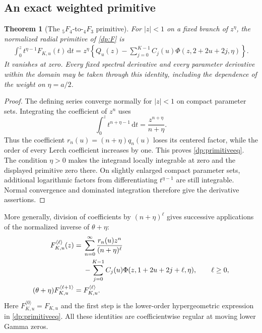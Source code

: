 \documentclass[11pt,a4paper]{article}
\numberwithin{equation}{section}
\newtheorem{theorem}{Theorem}[section]
\theoremstyle{definition}
\theoremstyle{remark}
\newcommand{\dd}{\,\mathrm d}
\begin{document}
\subsection{An exact weighted primitive}
\begin{theorem}[The ${}_5F_4$-to-${}_4F_3$ primitive]\label{dp:primitive}
For $|z|<1$ on a fixed branch of $z^\eta$, the normalized radial
primitive of \eqref{dp:F} is
\begin{align}
 \int_0^z t^{\eta-1}F_{K,u}(t)\dd t
  =z^\eta\left\{Q_u(z)-\sum_{j=0}^{K-1}
            C_j(u)\Phi(z,2+2u+2j,\eta)\right\}.
 \label{dp:primitiveeq}
\end{align}
It vanishes at zero. Every fixed spectral derivative and every
parameter derivative within the domain may be taken through this
identity, including the dependence of the weight on $\eta=a/2$.
\end{theorem}
\begin{proof}
The defining series converge normally for $|z|<1$ on compact parameter
sets. Integrating the coefficient of $z^n$ uses
\[
 \int_0^z t^{n+\eta-1}\dd t=\frac{z^{n+\eta}}{n+\eta}.
\]
Thus the coefficient $r_n(u)=(n+\eta)q_n(u)$ loses its centered
factor, while the order of every Lerch coefficient increases by one.
This proves \eqref{dp:primitiveeq}. The condition $\eta>0$ makes
the integrand locally integrable at zero and the displayed primitive
zero there. On slightly enlarged compact parameter sets, additional
logarithmic factors from differentiating $t^{\eta-1}$ are still
integrable. Normal convergence and dominated integration therefore
give the derivative assertions.
\end{proof}

More generally, division of coefficients by $(n+\eta)^\ell$ gives
successive applications of the normalized inverse of $\theta+\eta$:
\begin{align}
 F_{K,u}^{\langle\ell\rangle}(z)
 ={}&\sum_{n=0}^{\infty}
       \frac{r_n(u)z^n}{(n+\eta)^\ell}\notag\\
 &-\sum_{j=0}^{K-1}C_j(u)
            \Phi(z,1+2u+2j+\ell,\eta),\qquad \ell\ge0,
 \label{dp:ladder}\\
 (\theta+\eta)F_{K,u}^{\langle\ell+1\rangle}
 ={}&F_{K,u}^{\langle\ell\rangle}.
 \label{dp:ladderrec}
\end{align}
Here $F_{K,u}^{\langle0\rangle}=F_{K,u}$ and the first step is the
lower-order hypergeometric expression in \eqref{dp:primitiveeq}.
All these identities are coefficientwise regular at moving lower
Gamma zeros.
\end{document}
